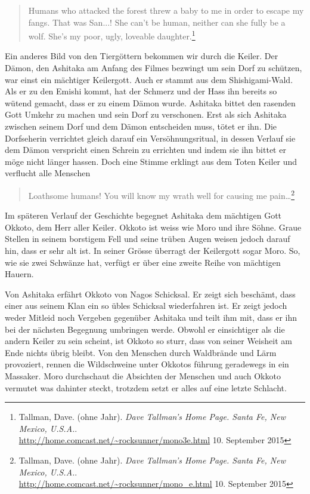 \begin{quote}
\glqq Humans who attacked the forest threw a baby to me in order to escape my fangs. That was San...! She can't be human, neither can she fully be a wolf. She's my poor, ugly, loveable daughter.\grqq \footnote{Tallman, Dave. (ohne Jahr). \emph{Dave Tallman's Home Page. Santa Fe, New Mexico, U.S.A.}.\\ \url{http://home.comcast.net/~rocksunner/mono3e.html} 10. September 2015}
\end{quote}

Ein anderes Bild von den Tiergöttern bekommen wir durch die Keiler. Der Dämon, den Ashitaka am Anfang des Filmes bezwingt um sein Dorf zu schützen, war einst ein mächtiger Keilergott. Auch er stammt aus dem Shishigami-Wald. Als er zu den Emishi kommt, hat der Schmerz und der Hass ihn bereits so wütend gemacht, dass er zu einem Dämon wurde. Ashitaka bittet den rasenden Gott Umkehr zu machen und sein Dorf zu verschonen. Erst als sich Ashitaka zwischen seinem Dorf und dem Dämon entscheiden muss, tötet er ihn. Die Dorfseherin verrichtet gleich darauf ein Versöhnungsritual, in dessen Verlauf sie dem Dämon verspricht einen Schrein zu errichten und indem sie ihn bittet er möge nicht länger hassen. Doch eine Stimme erklingt aus dem Toten Keiler und verflucht alle Menschen 

\begin{quote}
\glqq Loathsome humans! You will know my wrath well for causing me pain\dots \grqq \footnote{Tallman, Dave. (ohne Jahr). \emph{Dave Tallman's Home Page. Santa Fe, New Mexico, U.S.A.}.\\ \url{http://home.comcast.net/~rocksunner/mono_e.html} 10. September 2015}
\end{quote} 

Im späteren Verlauf der Geschichte begegnet Ashitaka dem mächtigen Gott Okkoto, dem Herr aller Keiler. Okkoto ist weiss wie Moro und ihre Söhne. Graue Stellen in seinem borstigem Fell und seine trüben Augen weisen jedoch darauf hin, dass er sehr alt ist. In seiner Grösse überragt der Keilergott sogar Moro. So, wie sie zwei Schwänze hat, verfügt er über eine zweite Reihe von mächtigen Hauern.  

Von Ashitaka erfährt Okkoto von Nagos Schicksal. Er zeigt sich beschämt, dass einer aus seinem Klan ein so übles Schicksal wiederfahren ist. Er zeigt jedoch weder Mitleid noch Vergeben gegenüber Ashitaka und teilt ihm mit, dass er ihn bei der nächsten Begegnung umbringen werde. Obwohl er einsichtiger als die andern Keiler zu sein scheint, ist Okkoto so sturr, dass von seiner Weisheit am Ende nichts übrig bleibt. Von den Menschen durch Waldbrände und Lärm provoziert, rennen die Wildschweine unter Okkotos führung geradewegs in ein Massaker. Moro durchschaut die Absichten der Menschen und auch Okkoto vermutet was dahinter steckt, trotzdem setzt er alles auf eine letzte Schlacht.  

